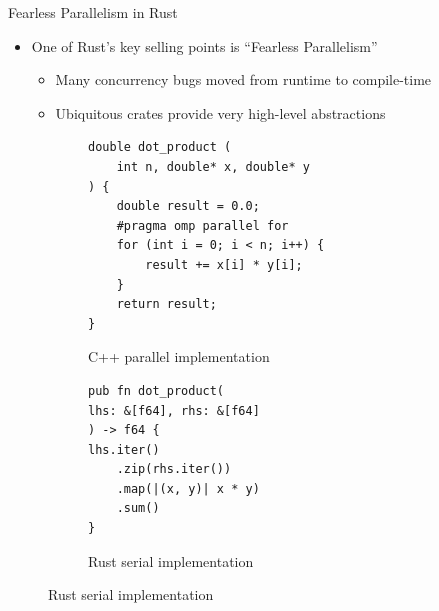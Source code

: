 \documentclass[10pt,aspectratio=169]{beamer}
\begin{document}
\begin{frame}{Fearless Parallelism in Rust}
    \begin{itemize}
        \item One of Rust's key selling points is ``Fearless Parallelism''
        \begin{itemize}
            \item Many concurrency bugs moved from runtime to compile-time
            \item Ubiquitous crates provide very high-level abstractions
        \end{itemize}
    \end{itemize}    
    \vspace*{0.15cm}

    \begin{figure}
        \begin{subfigure}[c]{.55\textwidth}\centering
            \begin{verbatim}
double dot_product (
    int n, double* x, double* y
) {
    double result = 0.0;
    #pragma omp parallel for
    for (int i = 0; i < n; i++) {
        result += x[i] * y[i];
    }
    return result;
}
            \end{verbatim}
            \label{fig:cpp-ddot-openmp-race}
            \caption{C++ parallel implementation}
             {
            }
        \end{subfigure}%
        \begin{subfigure}[c]{.45\textwidth}\centering
            \begin{verbatim}
pub fn dot_product(
lhs: &[f64], rhs: &[f64]
) -> f64 {
lhs.iter()
    .zip(rhs.iter())
    .map(|(x, y)| x * y)
    .sum()
}
            \end{verbatim}
            \label{fig:rust-ddot-serial-2}
            \vspace*{0.5cm}
            \caption{Rust serial implementation}
        \end{subfigure}
    \end{figure}
\end{frame}
\end{document}
